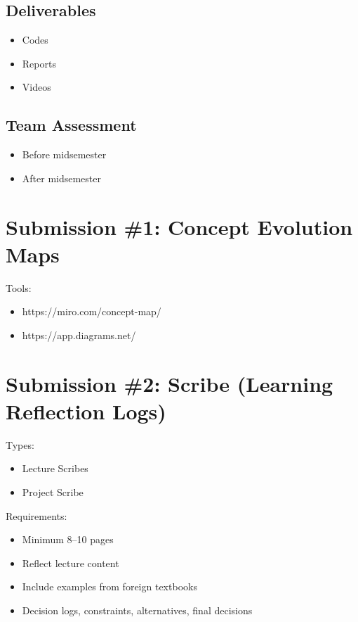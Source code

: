 \documentclass[12pt]{article}
\begin{document}
\subsection*{Deliverables}

\begin{itemize}
\item Codes
\item Reports
\item Videos
\end{itemize}

\subsection*{Team Assessment}

\begin{itemize}
\item Before midsemester
\item After midsemester
\end{itemize}

\section*{Submission \#1: Concept Evolution Maps}

Tools:
\begin{itemize}
\item https://miro.com/concept-map/
\item https://app.diagrams.net/
\end{itemize}

\section*{Submission \#2: Scribe (Learning Reflection Logs)}

Types:
\begin{itemize}
\item Lecture Scribes
\item Project Scribe
\end{itemize}

Requirements:
\begin{itemize}
\item Minimum 8--10 pages
\item Reflect lecture content
\item Include examples from foreign textbooks
\item Decision logs, constraints, alternatives, final decisions
\end{itemize}
\end{document}
